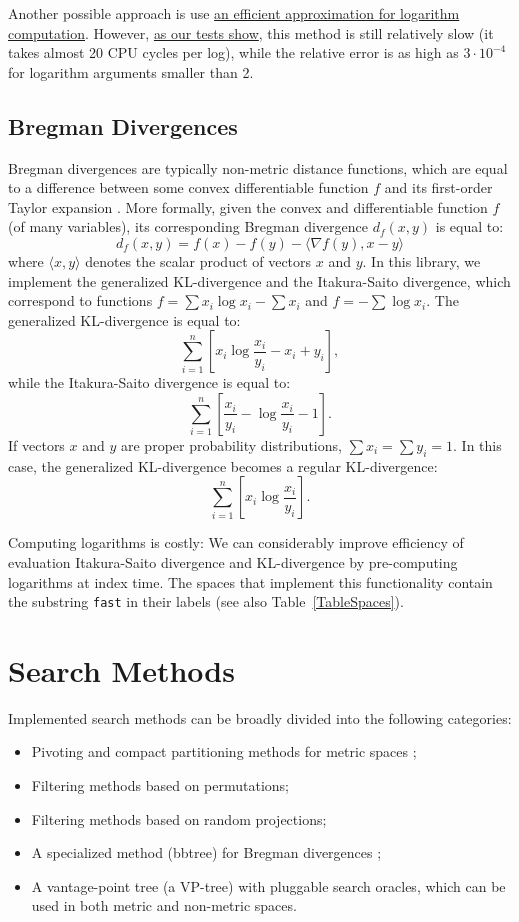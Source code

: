 \documentclass[runningheads,a4paper]{llncs}
\newcommand{\ttt}[1]{\texttt{#1}}
\begin{document}
{Another possible approach is use \href{http://fastapprox.googlecode.com/svn/trunk/fastapprox/src/fastonebigheader.h}{an efficient approximation for logarithm computation}.
However, \href{https://github.com/searchivarius/BlogCode/tree/master/2013/12/26}{as our tests show},
this method is still relatively slow (it takes almost 20 CPU cycles per log),
 while the relative error is as high as $3 \cdot 10^{-4}$ for logarithm arguments smaller than 2.

\subsection{Bregman Divergences}\label{SectionBregman}
Bregman divergences are typically non-metric distance functions,
which are equal to a difference between some convex differentiable function $f$
and its first-order Taylor expansion \cite{Bregman:1967,Cayton:2008}. 
More formally, given the convex and differentiable function $f$
(of many variables), its
corresponding Bregman divergence $d_f(x,y)$ is equal to:
$$
d_f(x,y) = f(x) - f(y) - \langle\nabla f(y), x - y \rangle
$$
where $\langle x,y\rangle$ denotes the scalar product of vectors $x$ and $y$.
In this library, we implement the generalized KL-divergence 
and the Itakura-Saito divergence,
which correspond to functions $f=\sum x_i \log x_i - \sum x_i$ and $f = - \sum \log x_i$. 
The generalized KL-divergence is equal to:
$$
\sum_{i=1}^n \left[  x_i \log \frac{x_i}{y_i} -   x_i +   y_i \right],
$$
while the Itakura-Saito divergence is equal to:
$$ 
\sum_{i=1}^n \left[ \frac{ x_i}{y_i} - \log \frac{x_i}{y_i}  -1 \right].
$$
If vectors $x$ and $y$ are proper probability distributions, $\sum x_i = \sum y_i = 1$.
In this case, the generalized KL-divergence becomes a regular KL-divergence:
$$
\sum_{i=1}^n \left[  x_i \log \frac{x_i}{y_i} \right].
$$

Computing logarithms is costly: We can considerably improve efficiency of 
evaluation Itakura-Saito divergence and KL-divergence by pre-computing logarithms at index time.
The spaces that implement this functionality contain the substring \ttt{fast} in their labels (see also Table~\ref{TableSpaces}).


\section{Search Methods}\label{SectionMethods}
Implemented search methods can be broadly divided into the following 
categories:
\begin{itemize}
\item Pivoting and compact partitioning methods for metric spaces \cite{Chavez_et_al:2001a};
\item Filtering methods based on permutations;
\item Filtering methods based on random projections;
\item A specialized method (bbtree) for Bregman divergences \cite{Cayton:2008};
\item A vantage-point tree (a VP-tree) with pluggable search oracles, 
which can be used in both metric and non-metric spaces.
\end{itemize}

}
\end{document}
